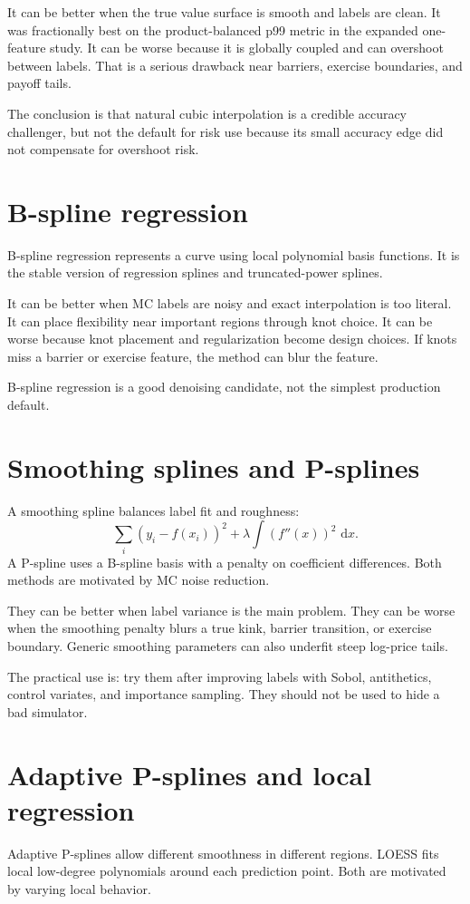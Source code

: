 \documentclass[11pt,oneside]{book}
\theoremstyle{definition}
\newcommand{\dd}{\,\mathrm{d}}
\begin{document}
It can be better when the true value surface is smooth and labels are clean.
It was fractionally best on the product-balanced p99 metric in the expanded
one-feature study. It can be worse because it is globally coupled and can
overshoot between labels. That is a serious drawback near barriers, exercise
boundaries, and payoff tails.

The conclusion is that natural cubic interpolation is a credible accuracy
challenger, but not the default for risk use because its small accuracy edge
did not compensate for overshoot risk.

\section{B-spline regression}
B-spline regression represents a curve using local polynomial basis functions.
It is the stable version of regression splines and truncated-power splines.

It can be better when MC labels are noisy and exact interpolation is too
literal. It can place flexibility near important regions through knot choice.
It can be worse because knot placement and regularization become design
choices. If knots miss a barrier or exercise feature, the method can blur the
feature.

B-spline regression is a good denoising candidate, not the simplest production
default.

\section{Smoothing splines and P-splines}
A smoothing spline balances label fit and roughness:
\[
  \sum_i (y_i-f(x_i))^2+\lambda\int (f''(x))^2\,\dd x.
\]
A P-spline uses a B-spline basis with a penalty on coefficient differences.
Both methods are motivated by MC noise reduction.

They can be better when label variance is the main problem. They can be worse
when the smoothing penalty blurs a true kink, barrier transition, or exercise
boundary. Generic smoothing parameters can also underfit steep log-price tails.

The practical use is: try them after improving labels with Sobol, antithetics,
control variates, and importance sampling. They should not be used to hide a
bad simulator.

\section{Adaptive P-splines and local regression}
Adaptive P-splines allow different smoothness in different regions. LOESS fits
local low-degree polynomials around each prediction point. Both are motivated
by varying local behavior.
\end{document}
